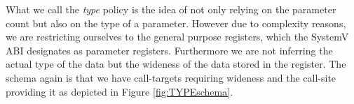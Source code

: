 What we call the \emph{type} policy is the idea of not only relying on the parameter count but also on the type of a parameter. However due to complexity reasons,
we are restricting ourselves to the general purpose registers, which the SystemV ABI designates as parameter registers. Furthermore we are not inferring 
the actual type of the data but the wideness of the data stored in the register. The schema again is that we have call-targets requiring wideness and the
call-site providing it as depicted in Figure \ref{fig:TYPEschema}.
%
%
%
%
%
%
%
